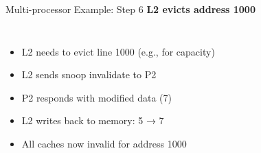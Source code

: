 \documentclass[aspectratio=169,12pt]{beamer}
\begin{document}
\begin{frame}{Multi-processor Example: Step 6}
  \textbf{L2 evicts address 1000}
  
  \begin{columns}
    \begin{itemize}
      \item L2 needs to evict line 1000 (e.g., for capacity)
      \item L2 sends snoop invalidate to P2
      \item P2 responds with modified data (7)
      \item L2 writes back to memory: 5 → 7
      \item All caches now invalid for address 1000
    \end{itemize}
    
  \end{columns}
\end{frame}
\end{document}
